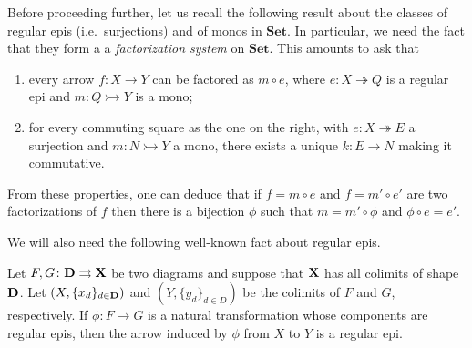 \documentclass[a4paper,UKenglish,cleveref,pdftex,thm-restate,numberwithinsect]{lipics-v2021}
\newcommand{\Set}{\mathbf{Set}}
\def\D{\textbf {\textup{D}}}
\def\X{\textbf {\textup{X}}}
\newcommand{\mto}{\rightarrowtail}
\newcommand{\eto}{\twoheadrightarrow}
\begin{document}
\begin{remark}\label{rem:fact}
	Before proceeding further, let us recall the following result about the classes of regular epis (i.e.~surjections) and of monos in $\Set$. In particular, we need the fact that they form a a \emph{factorization system} \cite{kelly2006note} on $\Set$.  This amounts to ask that
	
	\noindent 
	\parbox{11.5cm}{
	\begin{enumerate} 
		\item every arrow $f\colon X\to Y$ can be factored as $m\circ e$, where $e\colon X\eto Q$ is a regular epi and $m\colon Q\mto Y$ is a mono;
			\item for every commuting square as the one on the right, with $e\colon X\eto E$ a surjection and $m\colon N\mto Y$ a mono, there exists a unique $k\colon E\to N$ making it commutative.
	\end{enumerate}}\hfill \parbox{2cm}{}
	
	\hspace{1pt}\newline 
	From these properties, one can deduce that if $f=m\circ e$ and $f=m'\circ e'$ are two factorizations of $f$ then there is a bijection $\phi$ such that $m=m'\circ \phi$ and $\phi \circ e=e'$.
\end{remark}

We will also need the following well-known fact about regular epis.

\begin{lemma}\label{lemma:nat_trans_reg_epi_canonical_arrow_reg_epi}
	Let $F,G\colon \D\rightrightarrows \X$ be two diagrams and suppose that $\X$ has all colimits of shape $\D$. Let $(X, \{x_d\}_{d \in \D})$ and $(Y, \{y_d\}_{d\in D})$ be the colimits of $F$ and $G$, respectively.  If $\phi\colon  F \to G$ is a natural transformation whose components are regular epis, then the arrow induced by $\phi$ from $X$ to $Y$ is a regular epi.
\end{lemma}

\noindent
\parbox{11.4cm}{
\comp*}\hfill 
\parbox{2cm}{}   
\end{document}
